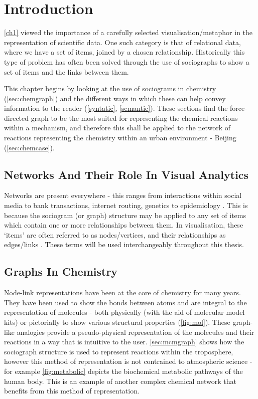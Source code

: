 
\section{Introduction}
\autoref{ch1} viewed the importance of a carefully selected visualisation/metaphor in the representation of scientific data. One such category is that of relational data, where we have a set of items, joined by a chosen relationship. Historically
this type of problem has often been solved through the use of sociographs to show a set of items and the links between them. 

This chapter begins by looking at the use of sociograms in chemistry (\autoref{sec:chemgraph}) and the different ways in which these can help convey information to the reader (\autoref{syntatic}, \autoref{semantic}). These sections find the force-directed graph to be the most suited for representing the chemical reactions within a mechanism, and therefore this shall be applied to the network of reactions representing the chemistry within an urban environment - Beijing (\autoref{sec:chemcase}).


\subsection{Networks And Their Role In Visual Analytics} \label{sec:va}
Networks are present everywhere - this ranges from interactions within social media to bank transactions, internet routing, genetics to epidemiology \citep{worldmap, epidim,neoj4,netneuro,prbank,ch4,ch8,ch9}. This is because the sociogram (or graph) structure may be applied to any set of items which contain one or more relationships between them. In visualisation, these `items' are often referred to as nodes/vertices, and their relationships as edges/links \citep{ch1}. These terms will be used interchangeably throughout this thesis. 


\subsection{Graphs In Chemistry}\label{sec:chemgraph}
Node-link representations have been at the core of chemistry for many years. They have been used to show the bonds between atoms and are integral to the representation of molecules - both physically (with the aid of molecular model kits) or pictorially to show various structural properties (\autoref{fig:mol}). These graph-like analogies provide a pseudo-physical representation of the molecules and their reactions in a way that is intuitive to the user. \autoref{sec:mcmgraph} shows how the sociograph structure is used to represent reactions within the troposphere, however this method of representation is not contrained to atmospheric science - for example \autoref{fig:metabolic} depicts the biochemical metabolic pathways of the human body. This is an example of another complex chemical network that benefits from this method of representation.





